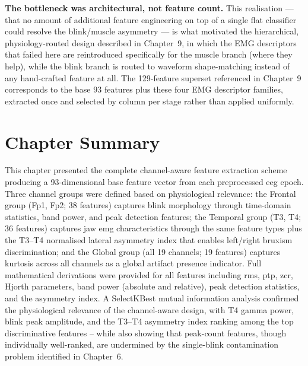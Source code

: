 \textbf{The bottleneck was architectural, not feature count.}
This realisation --- that no amount of additional feature
engineering on top of a single flat classifier could resolve
the blink/muscle asymmetry --- is what motivated the
hierarchical, physiology-routed design described in Chapter~9,
in which the EMG descriptors that failed here are reintroduced
specifically for the muscle branch (where they help), while the
blink branch is routed to waveform shape-matching instead of
any hand-crafted feature at all. The 129-feature superset
referenced in Chapter~9 corresponds to the base 93 features
plus these four EMG descriptor families, extracted once and
selected by column per stage rather than applied uniformly.

\section{Chapter Summary}
\label{sec:fe_summary}

This chapter presented the complete channel-aware feature
extraction scheme producing a 93-dimensional base feature
vector from each preprocessed \acrshort{eeg} epoch. Three
channel groups were defined based on physiological relevance:
the Frontal group (Fp1, Fp2; 38 features) captures blink
morphology through time-domain statistics, band power, and
peak detection features; the Temporal group (T3, T4; 36
features) captures jaw \acrshort{emg} characteristics
through the same feature types plus the T3--T4 normalised
lateral asymmetry index that enables left/right bruxism
discrimination; and the Global group (all 19 channels;
19 features) captures kurtosis across all channels as
a global artifact presence indicator. Full mathematical
derivations were provided for all features including
\acrshort{rms}, \acrshort{ptp}, \acrshort{zcr}, Hjorth
parameters, band power (absolute and relative), peak
detection statistics, and the asymmetry index. A
SelectKBest mutual information analysis confirmed the
physiological relevance of the channel-aware design,
with T4 gamma power, blink peak amplitude, and the
T3--T4 asymmetry index ranking among the top
discriminative features -- while also showing that peak-count
features, though individually well-ranked, are undermined by
the single-blink contamination problem identified in Chapter~6.

